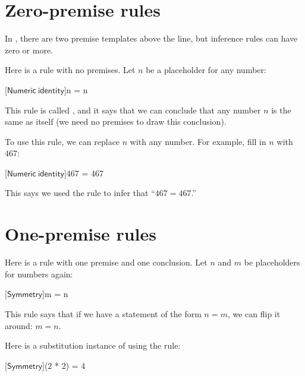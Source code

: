 \documentclass[../../../main.tex]{subfiles}
\begin{document}
\section{Zero-premise rules}

In , there are two premise templates above the line, but inference rules can have zero or more. 

Here is a rule with no premises. Let $n$ be a placeholder for any number:

\begin{prooftree*}
  \hypo{}
  [$\mathsf{Numeric~identity}$]{n = n}
\end{prooftree*}

\noindent
This rule is called , and it says that we can conclude that any number $n$ is the same as itself (we need no premises to draw this conclusion).

To use this rule, we can replace $n$ with any number. For example, fill in $n$ with $467$:

\begin{prooftree*}
  \hypo{}
  [$\mathsf{Numeric~identity}$]{467 = 467}
\end{prooftree*}

\noindent
This says we used the rule  to infer that ``$467 = 467$.'' 


\section{One-premise rules}

Here is a rule with one premise and one conclusion. Let $n$ and $m$ be placeholders for numbers again:

\begin{prooftree*}
  [$\mathsf{Symmetry}$]{m = n}
\end{prooftree*}

\noindent
This rule says that if we have a statement of the form $n = m$, we can flip it around: $m = n$.

Here is a substitution instance of using the rule:

\begin{prooftree*}
  [$\mathsf{Symmetry}$]{(2 * 2) = 4}
\end{prooftree*}
\end{document}

